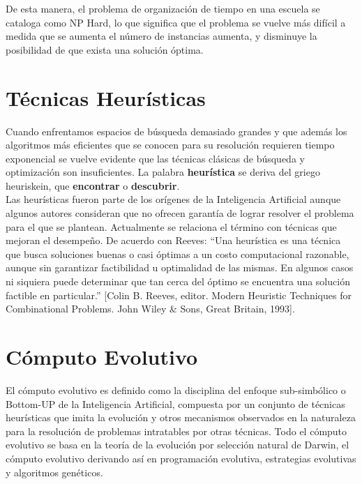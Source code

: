 	De esta manera, el problema de organización de tiempo en una escuela se cataloga como NP Hard, lo que significa que el problema se vuelve más difícil a medida que se aumenta el número de instancias aumenta, y disminuye la posibilidad de que exista una solución óptima.\\

	\section{Técnicas Heurísticas}
	
		Cuando enfrentamos espacios de búsqueda demasiado grandes y que además los algoritmos más eficientes que se conocen para su resolución requieren tiempo exponencial se vuelve evidente que las técnicas clásicas de búsqueda y optimización son insuficientes. La palabra \textbf{heurística} se deriva del griego heuriskein, que \textbf{encontrar} o \textbf{descubrir}. \\
		
		Las heurísticas fueron parte de los orígenes de la Inteligencia Artificial aunque algunos autores consideran que no ofrecen garantía de lograr resolver el problema para el que se plantean. Actualmente se relaciona el término con técnicas que mejoran el desempeño. De acuerdo con Reeves: “Una heurística es una técnica que busca soluciones buenas o casi óptimas a un costo computacional razonable, aunque sin garantizar factibilidad u optimalidad de las mismas. En algunos casos ni siquiera puede determinar que tan cerca del óptimo se encuentra una solución factible en particular.” [Colin B. Reeves, editor. Modern Heuristic Techniques for Combinational Problems. John Wiley \& Sons, Great Britain, 1993].\\

	\section{Cómputo Evolutivo}
		
		El cómputo evolutivo es definido como la disciplina del enfoque sub-simbólico o Bottom-UP de la Inteligencia Artificial, compuesta por un conjunto de técnicas heurísticas que imita la evolución y otros mecanismos observados en la naturaleza para la resolución de problemas intratables por otras técnicas. Todo el cómputo evolutivo se basa en la teoría de la evolución por selección natural de Darwin, el cómputo evolutivo derivando así en programación evolutiva, estrategias evolutivas y algoritmos genéticos.\\

